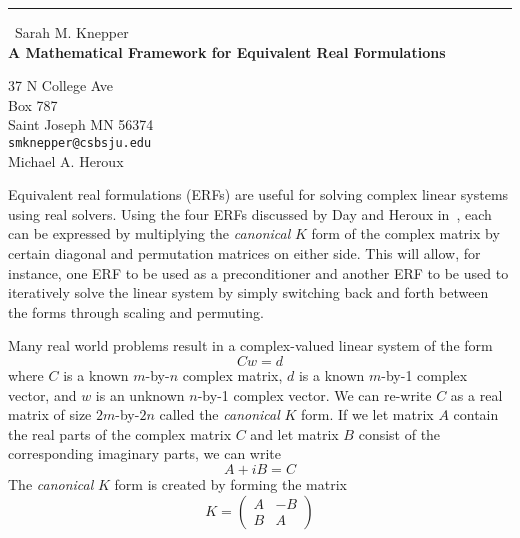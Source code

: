 \documentclass{report}
\begin{document}
\begin{center}
\rule{6in}{1pt} \
{\large Sarah M. Knepper \\
{\bf A Mathematical Framework for Equivalent Real Formulations}}

37 N College Ave \\ Box 787 \\ Saint Joseph MN 56374
\\
{\tt smknepper@csbsju.edu}\\
Michael A. Heroux\end{center}

Equivalent real formulations (ERFs) are useful for solving complex linear
systems using real solvers. Using the four ERFs discussed by Day and
Heroux in~\cite{Day}, each can be expressed by multiplying the
\emph{canonical} $K$ form of the complex matrix by certain diagonal and
permutation matrices on either side. This will allow, for instance, one
ERF to be used as a preconditioner and another ERF to be used to
iteratively solve the linear system by simply switching back and forth
between the forms through scaling and permuting.

Many real world problems result in a complex-valued linear system of the form
\begin{equation*}
\label{complex} C w = d
\end{equation*}
where $C$ is a known $m$-by-$n$ complex matrix, $d$ is a known
$m$-by-1 complex vector, and $w$ is an unknown $n$-by-1 complex
vector. We can re-write $C$ as a real matrix of size $2m$-by-$2n$ called
the \emph{canonical} $K$ form. If we let matrix $A$ contain the real
parts of the complex matrix $C$ and let matrix $B$ consist of the
corresponding imaginary parts, we can write
\begin{equation*}
\label{abequation} A + i B = C
\end{equation*}
The \emph{canonical} $K$ form is created by forming the matrix
\begin{equation*}
\label{canonk} K = \left(
\begin{array}{rr}
A & -B \\
B & A
\end{array}
\right)
\end{equation*}
\end{document}
